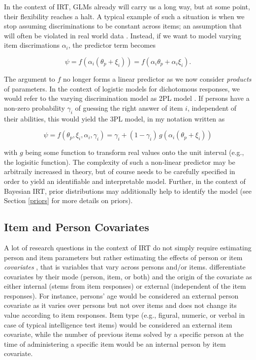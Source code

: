 \documentclass[jss]{jss}
\begin{document}
In the context of IRT, GLMs already will carry us a long way, but at
some point, their flexibility reaches a halt. A typical example of such
a situation is when we stop assuming discriminations to be constant
across items; an assumption that will often be violated in real world
data \citep{andrich2004}. Instead, if we want to model varying item
discrimations \(\alpha_i\), the predictor term becomes

\[
\psi = f(\alpha_i (\theta_p + \xi_i)) = f(\alpha_i \theta_p + \alpha_i \xi_i).
\]

The argument to \(f\) no longer forms a linear predictor as we now
consider \emph{products} of parameters. In the context of logistic
models for dichotomous responses, we would refer to the varying
discrimination model as 2PL model \citep[e.g.,][]{andrich2004}. If
persons have a non-zero probability \(\gamma_i\) of guessing the right
answer of item \(i\), independent of their abilities, this would yield
the 3PL model, in my notation written as

\[
\psi = f(\theta_{p}, \xi_{i}, \alpha_i, \gamma_i) = 
\gamma_i + (1 - \gamma_i) \, g(\alpha_i (\theta_p + \xi_i))
\]

with \(g\) being some function to transform real values onto the unit
interval (e.g., the logisitic function). The complexity of such a
non-linear predictor may be arbitraily increased in theory, but of
course needs to be carefully specified in order to yield an identifiable
and interpretable model. Further, in the context of Bayesian IRT, prior
distributions may additionally help to identify the model (see Section
\ref{priors} for more details on priors).

\hypertarget{item-and-person-covariates}{%
\subsection{Item and Person
Covariates}\label{item-and-person-covariates}}

A lot of research questions in the context of IRT do not simply require
estimating person and item parameters but rather estimating the effects
of person or item \emph{covariates} \citep{deboeck2011}, that is
variables that vary across persons and/or items. \citet{deboeck2011}
differentiate covariates by their mode (person, item, or both) and the
origin of the covariate as either internal (stems from item responses)
or external (independent of the item responses). For instance, persons'
age would be considered an external person covariate as it varies over
persons but not over items and does not change its value according to
item responses. Item type (e.g., figural, numeric, or verbal in case of
typical intelligence test items) would be considered an external item
covariate, while the number of previous items solved by a specific
person at the time of administering a specific item would be an internal
person by item covariate.
\end{document}
